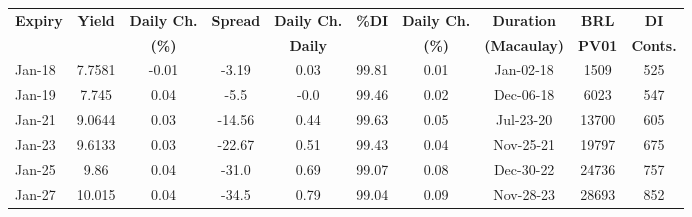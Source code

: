 \documentclass[article,crop=false]{standalone}%
\begin{document}
%
\normalsize%
\setlength{\tabcolsep}{0.15cm}%
\begin{tabular}[h]{l|c c|c c|c c|c c c}%
\hline%
\rowcolor{white}%
\textbf{Expiry}&\textbf{Yield}&\textbf{Daily Ch.}&\textbf{Spread}&\textbf{Daily Ch.}&\textbf{\%DI}&\textbf{Daily Ch.}&\textbf{Duration}&\textbf{BRL}&\textbf{DI}\\%
\rowcolor{white}%
\textbf{}&\textbf{}&\textbf{(\%)}&\textbf{}&\textbf{Daily}&\textbf{}&\textbf{(\%)}&\textbf{(Macaulay)}&\textbf{PV01}&\textbf{Conts.}\\%
\hline%
\rowcolor{lightgray}%
Jan{-}18&7.7581&{-}0.01&{-}3.19&0.03&99.81&0.01&Jan{-}02{-}18&1509&525\\%
\rowcolor{white}%
Jan{-}19&7.745&0.04&{-}5.5&{-}0.0&99.46&0.02&Dec{-}06{-}18&6023&547\\%
\rowcolor{lightgray}%
Jan{-}21&9.0644&0.03&{-}14.56&0.44&99.63&0.05&Jul{-}23{-}20&13700&605\\%
\rowcolor{white}%
Jan{-}23&9.6133&0.03&{-}22.67&0.51&99.43&0.04&Nov{-}25{-}21&19797&675\\%
\rowcolor{lightgray}%
Jan{-}25&9.86&0.04&{-}31.0&0.69&99.07&0.08&Dec{-}30{-}22&24736&757\\%
\rowcolor{white}%
Jan{-}27&10.015&0.04&{-}34.5&0.79&99.04&0.09&Nov{-}28{-}23&28693&852\\%
\hline%
\end{tabular}%
\end{document}

